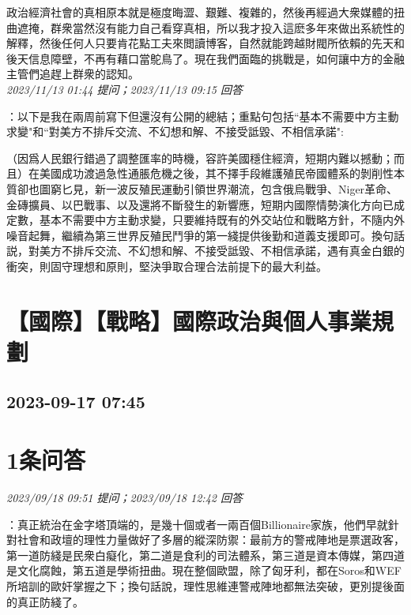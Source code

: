 \documentclass[twocolumn]{ctexart}
\begin{document}
政治經濟社會的真相原本就是極度晦澀、艱難、複雜的，然後再經過大衆媒體的扭曲遮掩，群衆當然沒有能力自己看穿真相，所以我才投入這麽多年來做出系統性的解釋，然後任何人只要肯花點工夫來閲讀博客，自然就能跨越財閥所依賴的先天和後天信息障壁，不再有藉口當鴕鳥了。現在我們面臨的挑戰是，如何讓中方的金融主管們追趕上群衆的認知。
\\

\textit{\hfill\noindent\small 2023/11/13 01:44 提问；2023/11/13 09:15 回答}

：以下是我在兩周前寫下但還沒有公開的總結；重點句包括“基本不需要中方主動求變"和“對美方不排斥交流、不幻想和解、不接受詆毀、不相信承諾":

（因爲人民銀行錯過了調整匯率的時機，容許美國穩住經濟，短期内難以撼動；而且）在美國成功渡過急性通脹危機之後，其不擇手段維護殖民帝國體系的剝削性本質卻也圖窮匕見，新一波反殖民運動引領世界潮流，包含俄烏戰爭、Niger革命、金磚擴員、以巴戰事、以及還將不斷發生的新響應，短期内國際情勢演化方向已成定數，基本不需要中方主動求變，只要維持既有的外交站位和戰略方針，不隨内外噪音起舞，繼續為第三世界反殖民鬥爭的第一綫提供後勤和道義支援即可。換句話説，對美方不排斥交流、不幻想和解、不接受詆毀、不相信承諾，遇有真金白銀的衝突，則固守理想和原則，堅決爭取合理合法前提下的最大利益。
\\


\section{【國際】【戰略】國際政治與個人事業規劃}
\subsection{2023-09-17 07:45}


\section{1条问答}

\textit{\hfill\noindent\small 2023/09/18 09:51 提问；2023/09/18 12:42 回答}

：真正統治在金字塔頂端的，是幾十個或者一兩百個Billionaire家族，他們早就針對社會和政壇的理性力量做好了多層的縱深防禦：最前方的警戒陣地是票選政客，第一道防綫是民衆白癡化，第二道是食利的司法體系，第三道是資本傳媒，第四道是文化腐蝕，第五道是學術扭曲。現在整個歐盟，除了匈牙利，都在Soros和WEF所培訓的歐奸掌握之下；換句話說，理性思維連警戒陣地都無法突破，更別提後面的真正防綫了。
\\
\end{document}
